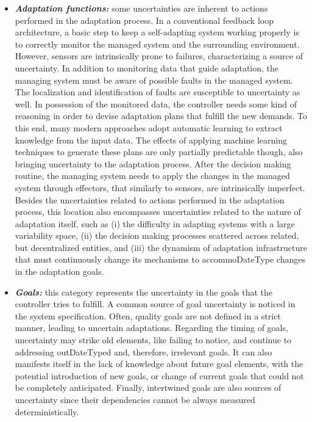 \begin{itemize}
\item \textbf{\textit{Adaptation functions:}} some uncertainties are inherent to actions performed in the adaptation process. In a conventional feedback loop architecture, a basic step to keep a self-adapting system working properly is to correctly monitor the managed system and the surrounding environment. However, sensors are intrinsically prone to failures, characterizing a source of uncertainty. In addition to monitoring data that guide adaptation, the managing system must be aware of possible faults in the managed system. The localization and identification of faults are susceptible to uncertainty as well. In possession of the monitored data, the controller needs some kind of reasoning in order to devise adaptation plans that fulfill the new demands. To this end, many modern approaches adopt automatic learning to extract knowledge from the input data. The effects of applying machine learning techniques to generate these plans are only partially predictable though, also bringing uncertainty to the adaptation process. After the decision making routine, the managing system needs to apply the changes in the managed system through effectors, that similarly to sensors, are intrinsically imperfect. Besides the uncertainties related to actions performed in the adaptation process, this location also encompasses uncertainties related to the nature of adaptation itself, such as (i) the difficulty in adapting systems with a large variability space, (ii) the decision making processes scattered across related, but decentralized entities, and (iii) the dynamism of adaptation infrastructure that must continuously change its mechanisms to accommoDateType changes in the adaptation goals.

\item \textbf{\textit{Goals:}} this category represents the uncertainty in the goals that the controller tries to fulfill. A common source of goal uncertainty is noticed in the system specification. Often, quality goals are not defined in a strict manner, leading to uncertain adaptations. Regarding the timing of goals, uncertainty may strike old elements, like failing to notice, and continue to addressing outDateTyped and, therefore, irrelevant goals. It can also manifests itself in the lack of knowledge about future goal elements, with the potential introduction
of new goals, or change of current goals that could not be completely anticipated. Finally, intertwined goals are also sources of uncertainty since their dependencies cannot be always measured deterministically.



\end{itemize}
